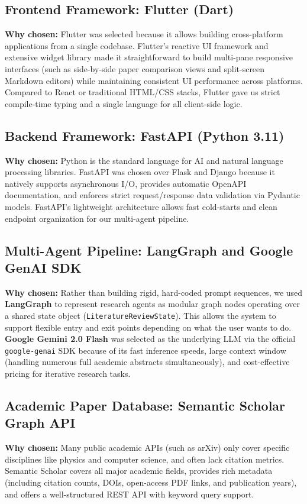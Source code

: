 \documentclass[11pt,a4paper]{article}
\begin{document}
\subsection{Frontend Framework: Flutter (Dart)}
\textbf{Why chosen:} Flutter was selected because it allows building cross-platform applications from a single codebase. Flutter's reactive UI framework and extensive widget library made it straightforward to build multi-pane responsive interfaces (such as side-by-side paper comparison views and split-screen Markdown editors) while maintaining consistent UI performance across platforms. Compared to React or traditional HTML/CSS stacks, Flutter gave us strict compile-time typing and a single language for all client-side logic.

\subsection{Backend Framework: FastAPI (Python 3.11)}
\textbf{Why chosen:} Python is the standard language for AI and natural language processing libraries. FastAPI was chosen over Flask and Django because it natively supports asynchronous I/O, provides automatic OpenAPI documentation, and enforces strict request/response data validation via Pydantic models. FastAPI's lightweight architecture allows fast cold-starts and clean endpoint organization for our multi-agent pipeline.

\subsection{Multi-Agent Pipeline: LangGraph and Google GenAI SDK}
\textbf{Why chosen:} Rather than building rigid, hard-coded prompt sequences, we used \textbf{LangGraph} to represent research agents as modular graph nodes operating over a shared state object (\texttt{LiteratureReviewState}). This allows the system to support flexible entry and exit points depending on what the user wants to do. \textbf{Google Gemini 2.0 Flash} was selected as the underlying LLM via the official \texttt{google-genai} SDK because of its fast inference speeds, large context window (handling numerous full academic abstracts simultaneously), and cost-effective pricing for iterative research tasks.

\subsection{Academic Paper Database: Semantic Scholar Graph API}
\textbf{Why chosen:} Many public academic APIs (such as arXiv) only cover specific disciplines like physics and computer science, and often lack citation metrics. Semantic Scholar covers all major academic fields, provides rich metadata (including citation counts, DOIs, open-access PDF links, and publication years), and offers a well-structured REST API with keyword query support.
\end{document}

